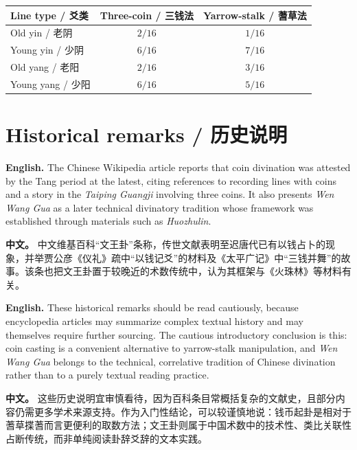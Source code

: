 \documentclass[11pt]{article}
\newcommand{\EN}[1]{\textcolor{labelgray}{\textbf{English.}} #1}
\newcommand{\CN}[1]{\textcolor{labelgray}{\textbf{中文。}} #1}
\newcommand{\bipar}[2]{\EN{#1}\par\CN{#2}\par\medskip}
\begin{document}
\begin{center}
\begin{tabular}{lcc}
\toprule
\textbf{Line type / 爻类} & \textbf{Three-coin / 三钱法} & \textbf{Yarrow-stalk / 蓍草法} \\
\midrule
Old yin / 老阴 & $2/16$ & $1/16$ \\
Young yin / 少阴 & $6/16$ & $7/16$ \\
Old yang / 老阳 & $2/16$ & $3/16$ \\
Young yang / 少阳 & $6/16$ & $5/16$ \\
\bottomrule
\end{tabular}
\end{center}

\section{Historical remarks / 历史说明}
\bipar{The Chinese Wikipedia article reports that coin divination was attested by the Tang period at the latest, citing references to recording lines with coins and a story in the \textit{Taiping Guangji} involving three coins. It also presents \textit{Wen Wang Gua} as a later technical divinatory tradition whose framework was established through materials such as \textit{Huozhulin}.}{中文维基百科“文王卦”条称，传世文献表明至迟唐代已有以钱占卜的现象，并举贾公彦《仪礼》疏中“以钱记爻”的材料及《太平广记》中“三钱并舞”的故事。该条也把文王卦置于较晚近的术数传统中，认为其框架与《火珠林》等材料有关。}
\bipar{These historical remarks should be read cautiously, because encyclopedia articles may summarize complex textual history and may themselves require further sourcing. The cautious introductory conclusion is this: coin casting is a convenient alternative to yarrow-stalk manipulation, and \textit{Wen Wang Gua} belongs to the technical, correlative tradition of Chinese divination rather than to a purely textual reading practice.}{这些历史说明宜审慎看待，因为百科条目常概括复杂的文献史，且部分内容仍需更多学术来源支持。作为入门性结论，可以较谨慎地说：钱币起卦是相对于蓍草揲蓍而言更便利的取数方法；文王卦则属于中国术数中的技术性、类比关联性占断传统，而非单纯阅读卦辞爻辞的文本实践。}
\end{document}
